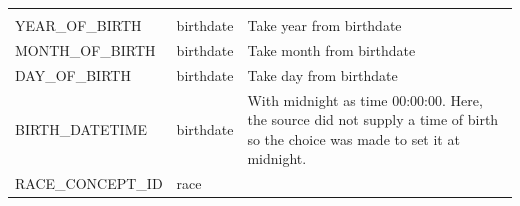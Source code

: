 \documentclass[11pt]{book}
\theoremstyle{definition}
\theoremstyle{definition}
\theoremstyle{definition}
\theoremstyle{remark}
\begin{document}
\begin{longtable}[]{@{}lll@{}}
\begin{minipage}[t]{0.51\columnwidth}
\end{minipage}\tabularnewline
\begin{minipage}[t]{0.28\columnwidth}\raggedright
YEAR\_OF\_BIRTH\strut
\end{minipage} & \begin{minipage}[t]{0.12\columnwidth}\raggedright
birthdate\strut
\end{minipage} & \begin{minipage}[t]{0.51\columnwidth}\raggedright
Take year from birthdate\strut
\end{minipage}\tabularnewline
\begin{minipage}[t]{0.28\columnwidth}\raggedright
MONTH\_OF\_BIRTH\strut
\end{minipage} & \begin{minipage}[t]{0.12\columnwidth}\raggedright
birthdate\strut
\end{minipage} & \begin{minipage}[t]{0.51\columnwidth}\raggedright
Take month from birthdate\strut
\end{minipage}\tabularnewline
\begin{minipage}[t]{0.28\columnwidth}\raggedright
DAY\_OF\_BIRTH\strut
\end{minipage} & \begin{minipage}[t]{0.12\columnwidth}\raggedright
birthdate\strut
\end{minipage} & \begin{minipage}[t]{0.51\columnwidth}\raggedright
Take day from birthdate\strut
\end{minipage}\tabularnewline
\begin{minipage}[t]{0.28\columnwidth}\raggedright
BIRTH\_DATETIME\strut
\end{minipage} & \begin{minipage}[t]{0.12\columnwidth}\raggedright
birthdate\strut
\end{minipage} & \begin{minipage}[t]{0.51\columnwidth}\raggedright
With midnight as time 00:00:00. Here, the source did not supply a time of birth so the choice was made to set it at midnight.\strut
\end{minipage}\tabularnewline
\begin{minipage}[t]{0.28\columnwidth}\raggedright
RACE\_CONCEPT\_ID\strut
\end{minipage} & \begin{minipage}[t]{0.12\columnwidth}\raggedright
race\strut
\end{minipage} & \begin{minipage}[t]{0.51\columnwidth}\raggedright

\end{minipage}
\end{longtable}
\end{document}
